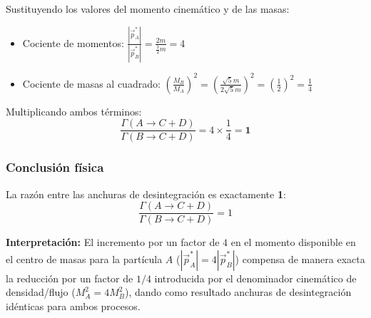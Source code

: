 \begin{problema}
Sustituyendo los valores del momento cinemático y de las masas:
\begin{itemize}
    \item Cociente de momentos: $\frac{|\vec{p}^*_A|}{|\vec{p}^*_B|} = \frac{2 m}{\frac{1}{2} m} = 4$
    \item Cociente de masas al cuadrado: $\left( \frac{M_B}{M_A} \right)^2 = \left( \frac{\sqrt{5} m}{2\sqrt{5} m} \right)^2 = \left( \frac{1}{2} \right)^2 = \frac{1}{4}$
\end{itemize}

Multiplicando ambos términos:
\begin{equation*}
\frac{\Gamma(A \rightarrow C + D)}{\Gamma(B \rightarrow C + D)} = 4 \times \frac{1}{4} = \mathbf{1}
\end{equation*}

\subsubsection*{Conclusión física}

La razón entre las anchuras de desintegración es exactamente \textbf{1}:
\begin{equation*}
\frac{\Gamma(A \rightarrow C + D)}{\Gamma(B \rightarrow C + D)} = 1
\end{equation*}

\textbf{Interpretación:} El incremento por un factor de $4$ en el momento disponible en el centro de masas para la partícula $A$ ($|\vec{p}^*_A| = 4 |\vec{p}^*_B|$) compensa de manera exacta la reducción por un factor de $1/4$ introducida por el denominador cinemático de densidad/flujo ($M_A^2 = 4 M_B^2$), dando como resultado anchuras de desintegración idénticas para ambos procesos.
\end{problema}

\newpage
